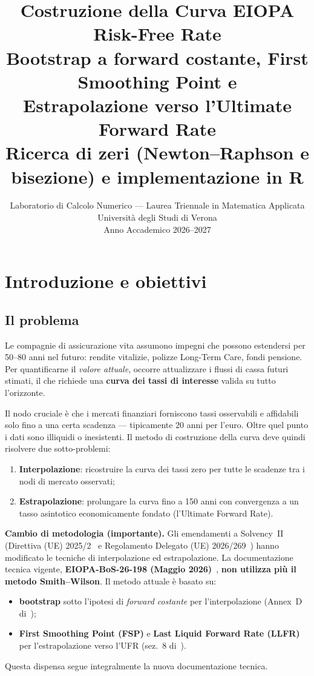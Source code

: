 \documentclass[11pt,a4paper]{article}
\title{%
  \textbf{Costruzione della Curva EIOPA Risk-Free Rate}\\[6pt]
  \large Bootstrap a forward costante, First Smoothing Point e\\[3pt]
  Estrapolazione verso l'Ultimate Forward Rate\\[4pt]
  \normalsize Ricerca di zeri (Newton--Raphson e bisezione) e implementazione in R
}
\author{Laboratorio di Calcolo Numerico --- Laurea Triennale in Matematica Applicata\\
  Universit\`a degli Studi di Verona\\[2pt]
  Anno Accademico 2026--2027}
\date{}
\theoremstyle{plain}
\theoremstyle{definition}
\theoremstyle{remark}
\begin{document}
\maketitle
\tableofcontents
\newpage

\section{Introduzione e obiettivi}
\label{sec:intro}

\subsection{Il problema}

Le compagnie di assicurazione vita assumono impegni che possono estendersi per
50--80 anni nel futuro: rendite vitalizie, polizze Long-Term Care, fondi pensione.
Per quantificarne il \emph{valore attuale}, occorre attualizzare i flussi di cassa
futuri stimati, il che richiede una \textbf{curva dei tassi di interesse} valida su
tutto l'orizzonte.

Il nodo cruciale \`e che i mercati finanziari forniscono tassi osservabili e affidabili
solo fino a una certa scadenza --- tipicamente 20 anni per l'euro. Oltre quel punto i
dati sono illiquidi o inesistenti. Il metodo di costruzione della curva deve quindi
risolvere due sotto-problemi:
\begin{enumerate}
  \item \textbf{Interpolazione}: ricostruire la curva dei tassi zero per tutte le
        scadenze tra i nodi di mercato osservati;
  \item \textbf{Estrapolazione}: prolungare la curva fino a 150 anni con convergenza
        a un tasso asintotico economicamente fondato (l'Ultimate Forward Rate).
\end{enumerate}

\begin{warningbox}
\textbf{Cambio di metodologia (importante).} Gli emendamenti a Solvency~II
(Direttiva (UE) 2025/2~\cite{dir2025} e Regolamento Delegato (UE)
2026/269~\cite{reg2026}) hanno modificato le tecniche di interpolazione ed
estrapolazione. La documentazione tecnica vigente,
\textbf{EIOPA-BoS-26-198 (Maggio 2026)}~\cite{eiopa2026}, \textbf{non utilizza pi\`u
il metodo Smith--Wilson}. Il metodo attuale \`e basato su:
\begin{itemize}
  \item \textbf{bootstrap} sotto l'ipotesi di \emph{forward costante} per
        l'interpolazione (Annex~D di~\cite{eiopa2026});
  \item \textbf{First Smoothing Point (FSP)} e \textbf{Last Liquid Forward Rate
        (LLFR)} per l'estrapolazione verso l'UFR (sez.~8 di~\cite{eiopa2026}).
\end{itemize}
Questa dispensa segue integralmente la nuova documentazione tecnica.
\end{warningbox}
\end{document}
